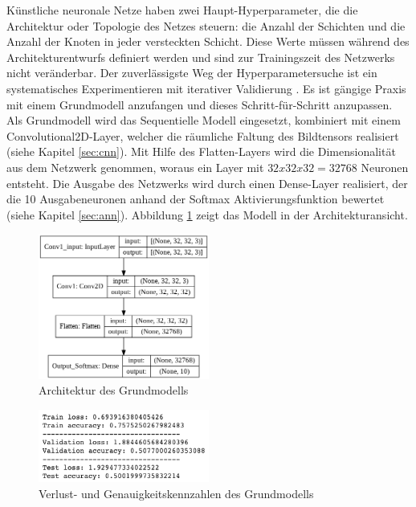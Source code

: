 Künstliche neuronale Netze haben zwei Haupt-Hyperparameter, die die Architektur oder Topologie des Netzes steuern: die Anzahl der Schichten und die Anzahl der Knoten in jeder versteckten Schicht. Diese Werte müssen während des Architekturentwurfs definiert werden und sind zur Trainingszeit des Netzwerks nicht veränderbar. Der zuverlässigste Weg der Hyperparametersuche ist ein systematisches Experimentieren mit iterativer Validierung \cite{hyperparameter_cnn}. Es ist gängige Praxis mit einem Grundmodell anzufangen und dieses Schritt-für-Schritt anzupassen. Als Grundmodell wird das Sequentielle Modell eingesetzt, kombiniert mit einem Convolutional2D-Layer, welcher die räumliche Faltung des Bildtensors realisiert (siehe Kapitel \ref{sec:cnn}). Mit Hilfe des Flatten-Layers wird die Dimensionalität aus dem Netzwerk genommen, woraus ein Layer mit $32x32x32 = 32768$ Neuronen entsteht. Die Ausgabe des Netzwerks wird durch einen Dense-Layer realisiert, der die 10 Ausgabeneuronen anhand der Softmax Aktivierungsfunktion bewertet (siehe Kapitel \ref{sec:ann}). Abbildung \ref{fig:basemodell} zeigt das Modell in der Architekturansicht. 

\begin{figure}[htb]
	\centering
	\includegraphics[width=0.5\textwidth]{images/model1}
	\caption{Architektur des Grundmodells}
	\label{fig:basemodell}
\end{figure}

\begin{figure}[htb]
	\centering
	\includegraphics[width=0.5\textwidth]{images/model1_scores}
	\caption{Verlust- und Genauigkeitskennzahlen des Grundmodells}
	\label{fig:model1_scores}
\end{figure}


